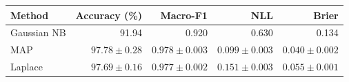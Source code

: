 \begin{tabular}{lrrrr}\toprule
Method & Accuracy (\%) & Macro-F1 & NLL & Brier \\\midrule
Gaussian NB & 91.94 & 0.920 & 0.630 & 0.134\\
MAP & $97.78\pm 0.28$ & $0.978\pm 0.003$ & $0.099\pm 0.003$ & $0.040\pm 0.002$\\
Laplace & $97.69\pm 0.16$ & $0.977\pm 0.002$ & $0.151\pm 0.003$ & $0.055\pm 0.001$\\
\bottomrule\end{tabular}